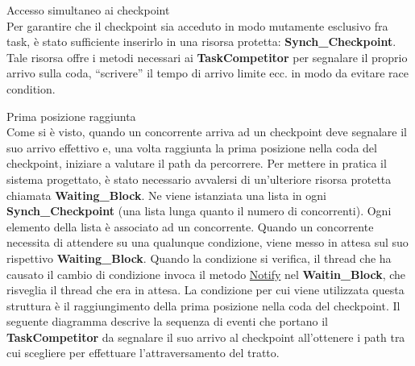 \begin{description}
\item{Accesso simultaneo ai checkpoint}\\
Per garantire che il checkpoint sia acceduto in modo mutamente esclusivo fra task, \`{e} stato sufficiente inserirlo in una risorsa protetta:
\textbf{Synch\_Checkpoint}. Tale risorsa offre i metodi necessari ai \textbf{TaskCompetitor} per segnalare il proprio arrivo sulla coda,
``scrivere'' il tempo di arrivo limite ecc. in modo da evitare race condition.
\item{Prima posizione raggiunta}\\
Come si \`{e} visto, quando un concorrente arriva ad un checkpoint deve segnalare il suo arrivo effettivo e, una volta raggiunta la prima posizione
nella coda del checkpoint, iniziare a valutare il path da percorrere. Per mettere in pratica il sistema progettato, \`{e} stato necessario avvalersi
di un'ulteriore risorsa protetta chiamata \textbf{Waiting\_Block}. Ne viene istanziata una lista in ogni \textbf{Synch\_Checkpoint} (una lista
lunga quanto il numero di concorrenti). Ogni elemento della lista \`{e} associato ad un concorrente. 
Quando un concorrente necessita di attendere su una qualunque condizione, viene messo in attesa
sul suo rispettivo \textbf{Waiting\_Block}. Quando la condizione si verifica, il thread che ha causato il cambio
di condizione invoca il metodo \underline{Notify} nel \textbf{Waitin\_Block}, che risveglia il thread che era in attesa.
La condizione per cui viene utilizzata questa struttura \`{e} il raggiungimento della prima posizione nella coda del checkpoint. Il seguente diagramma
descrive la sequenza di eventi che portano il \textbf{TaskCompetitor} da segnalare il suo arrivo al checkpoint all'ottenere i path tra cui
scegliere per effettuare l'attraversamento del tratto.
\begin{center}
\begin{figure}[h!]
\advance\leftskip-2.2cm

\end{figure}
\end{center}
\end{description}
